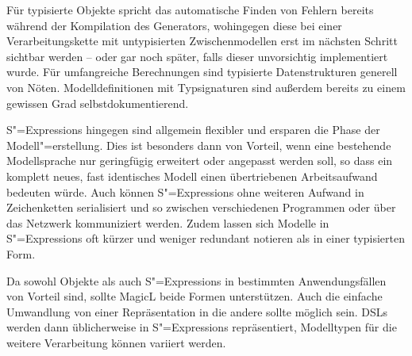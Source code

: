 \documentclass[12pt, a4paper, bibgerm]{scrbook}
\newcommand{\sexps}{S"=Expressions}
\begin{document}
Für typisierte Objekte spricht das automatische Finden von Fehlern
bereits während der Kompilation des Generators, wohingegen diese bei
einer Verarbeitungskette mit untypisierten Zwischenmodellen erst im
nächsten Schritt sichtbar werden -- oder gar noch später,
falls dieser unvorsichtig implementiert wurde. Für umfangreiche
Berechnungen sind typisierte Datenstrukturen generell
von Nöten. Modelldefinitionen mit Typsignaturen sind außerdem bereits zu
einem gewissen Grad selbstdokumentierend.

\sexps{} hingegen sind allgemein flexibler und ersparen die Phase der
Modell"=erstellung. Dies ist besonders dann von Vorteil, wenn eine
bestehende Modellsprache nur geringfügig erweitert oder angepasst werden
soll, so dass ein komplett neues, fast identisches Modell einen
übertriebenen Arbeitsaufwand bedeuten würde. Auch können \sexps{} ohne
weiteren Aufwand in Zeichenketten serialisiert und so zwischen
verschiedenen Programmen oder über das Netzwerk kommuniziert
werden. Zudem lassen sich Modelle in \sexps{} oft kürzer und
weniger redundant notieren als in einer typisierten Form.

Da sowohl Objekte als auch \sexps{} in bestimmten Anwendungsfällen von
Vorteil sind, sollte MagicL beide Formen unterstützen. Auch die
einfache Umwandlung von einer Repräsentation in die andere sollte
möglich sein. DSLs werden dann üblicherweise in \sexps{}
repräsentiert, Modelltypen für die weitere Verarbeitung können variiert
werden.
\end{document}
